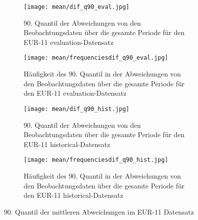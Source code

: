 \begin{figure}[hbt!]
	\begin{subfigure}{0.49\textwidth}
		\centering
		\texttt{[image: mean/dif\_q90\_eval.jpg]}
		\caption{90. Quantil der Abweichungen von den Beobachtungsdaten über die gesamte Periode für den EUR-11 evaluation-Datensatz}
		\label{fig:q90_dif_eval}
	\end{subfigure}
	\begin{subfigure}{0.49\textwidth}
		\centering
		\texttt{[image: mean/frequenciesdif\_q90\_eval.jpg]}
		\caption{Häufigkeit des 90. Quantil in der Abweichungen von den Beobachtungsdaten über die gesamte Periode für den EUR-11 evaluation-Datensatz}
		\label{fig:q90_freq_dif_eval}
	\end{subfigure}
	\begin{subfigure}{0.49\textwidth}
		\centering
		\texttt{[image: mean/dif\_q90\_hist.jpg]}
		\caption{90. Quantil der Abweichungen von den Beobachtungsdaten über die gesamte Periode für den EUR-11 historical-Datensatz}
		\label{fig:q90_dif_hist}
	\end{subfigure}
	\begin{subfigure}{0.49\textwidth}
		\centering
		\texttt{[image: mean/frequenciesdif\_q90\_hist.jpg]}
		\caption{Häufigkeit des 90. Quantil in der Abweichungen von den Beobachtungsdaten über die gesamte Periode für den EUR-11 historical-Datensatz}
		\label{fig:q90_freq_dif_hist}
	\end{subfigure}
	\caption{90. Quantil der mittleren Abweichungen im EUR-11 Datensatz}
\end{figure}
\\

